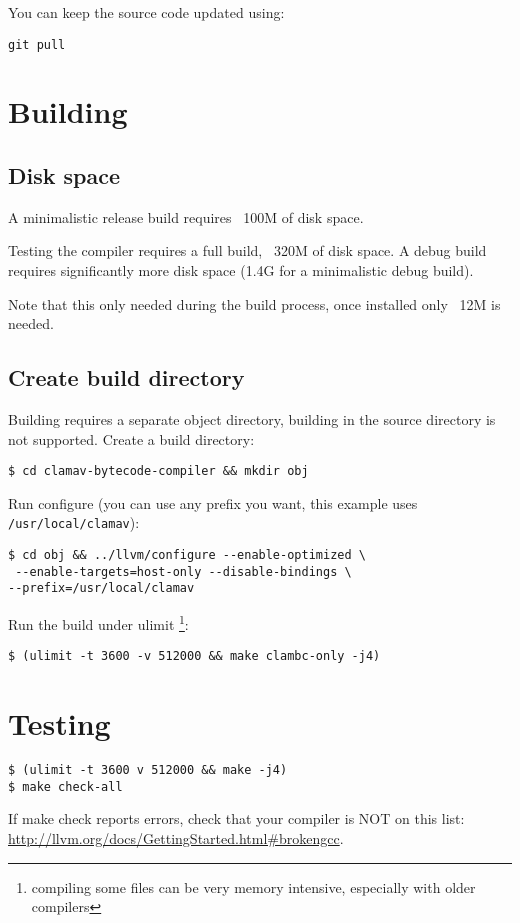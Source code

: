 You can keep the source code updated using:

\verb+git pull+

\section{Building}
\subsection{Disk space}
A minimalistic release build requires ~100M of disk space.

Testing the compiler requires a full build, ~320M of disk space.
A debug build requires significantly more disk space (1.4G for a minimalistic
debug build).

Note that this only needed during the build process, once installed only ~12M
is needed.

\subsection{Create build directory}
Building requires a separate object directory, building in the source directory is not supported.
Create a build directory:

\verb+$ cd clamav-bytecode-compiler && mkdir obj+

Run configure (you can use any prefix you want, this example uses \verb+/usr/local/clamav+):
\begin{verbatim}
$ cd obj && ../llvm/configure --enable-optimized \
 --enable-targets=host-only --disable-bindings \
--prefix=/usr/local/clamav
\end{verbatim}

Run the build under ulimit \footnote{compiling some files can be very memory intensive, especially with older compilers}:
\begin{verbatim}
$ (ulimit -t 3600 -v 512000 && make clambc-only -j4)
\end{verbatim}

\section{Testing}
\begin{verbatim}
$ (ulimit -t 3600 v 512000 && make -j4)
$ make check-all
\end{verbatim}

If make check reports errors, check that your compiler is NOT on this list:
\url{http://llvm.org/docs/GettingStarted.html#brokengcc}.

